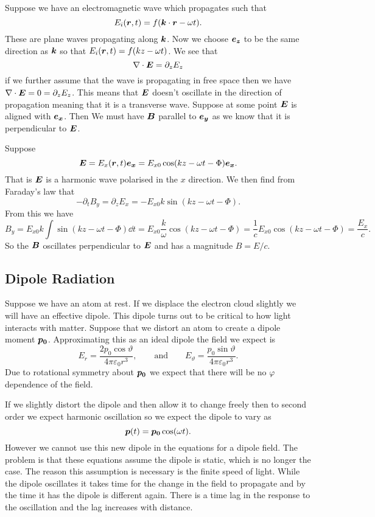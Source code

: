     Suppose we have an electromagnetic wave which propagates such that
    \[E_i(\bm{r}, t) = f(\bm{k}\cdot\bm{r} - \omega t).\]
    These are plane waves propagating along \(\bm{k}\).
    Now we choose \(\bm{e_{z}}\) to be the same direction as \(\bm{k}\) so that \(E_i(\bm{r}, t) = f(kz - \omega t)\).
    We see that
    \[\nabla\cdot\bm{E} = \partial_z E_z\]
    if we further assume that the wave is propagating in free space then we have \(\nabla\cdot\bm{E} = 0 = \partial_z E_z\).
    This means that \(\bm{E}\) doesn't oscillate in the direction of propagation meaning that it is a transverse wave.
    Suppose at some point \(\bm{E}\) is aligned with \(\bm{e_{x}}\).
    Then We must have \(\bm{B}\) parallel to \(\bm{e_{y}}\) as we know that it is perpendicular to \(\bm{E}\).
    
    Suppose
    \[\bm{E} = E_x(\bm{r}, t)\bm{e_{x}} = E_{x0}\cos(kz - \omega t - \Phi)\bm{e_{x}}.\]
    That is \(\bm{E}\) is a harmonic wave polarised in the \(x\) direction.
    We then find from Faraday's law that
    \[-\partial_t B_y = \partial_z E_x = -E_{x0}k\sin(kz - \omega t - \Phi).\]
    From this we have
    \[B_y = E_{x0}k \int \sin(kz - \omega t - \Phi) \dd{t} = E_{x0}\frac{k}{\omega}\cos(kz - \omega t - \Phi) = \frac{1}{c}E_{x0}\cos(kz - \omega t - \Phi) = \frac{E_x}{c}.\]
    So the \(\bm{B}\) oscillates perpendicular to \(\bm{E}\) and has a magnitude \(B = E/c\).
    
    \subsection{Dipole Radiation}
    Suppose we have an atom at rest.
    If we displace the electron cloud slightly we will have an effective dipole.
    This dipole turns out to be critical to how light interacts with matter.
    Suppose that we distort an atom to create a dipole moment \(\bm{p_0}\).
    Approximating this as an ideal dipole the field we expect is
    \[E_r = \frac{2p_0\cos\vartheta}{4\pi\varepsilon_0r^3}, \qquad\text{and}\qquad E_\vartheta = \frac{p_0\sin\vartheta}{4\pi\varepsilon_0r^3}.\]
    Due to rotational symmetry about \(\bm{p_0}\) we expect that there will be no \(\varphi\) dependence of the field.
    
    If we slightly distort the dipole and then allow it to change freely then to second order we expect harmonic oscillation so we expect the dipole to vary as
    \[\bm{p}(t) = \bm{p_0}\cos(\omega t).\]
    However we cannot use this new dipole in the equations for a dipole field.
    The problem is that these equations assume the dipole is static, which is no longer the case.
    The reason this assumption is necessary is the finite speed of light.
    While the dipole oscillates it takes time for the change in the field to propagate and by the time it has the dipole is different again.
    There is a time lag in the response to the oscillation and the lag increases with distance.
    
